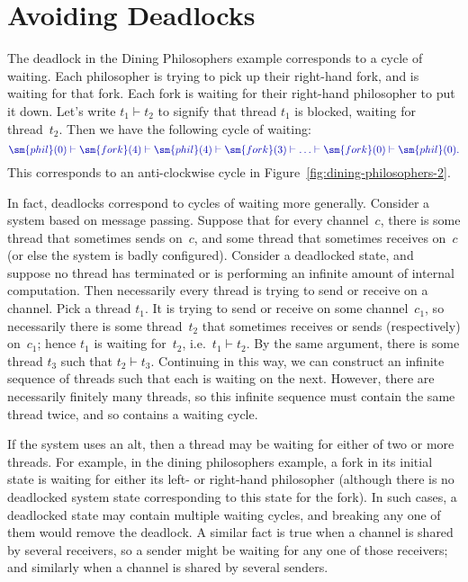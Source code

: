 \section{Avoiding Deadlocks}
\label{sec:avoid-deadlocks}

\def\waitingFor{\vdash}

The deadlock in the Dining Philosophers example corresponds to a cycle of
waiting.  Each philosopher is trying to pick up their right-hand fork, and is
waiting for that fork.  Each fork is waiting for their right-hand philosopher
to put it down.  Let's write $t_1 \waitingFor t_2$ to signify that thread
$t_1$ is blocked, waiting for thread~$t_2$.  Then we have the following cycle
of waiting:
\[\mstyle
\sm{phil}(0) \waitingFor \sm{fork}(4) \waitingFor \sm{phil}(4) \waitingFor
  \sm{fork}(3) \waitingFor \ldots \waitingFor \sm{fork}(0) \waitingFor
  \sm{phil}(0).
\]
This corresponds to an anti-clockwise cycle in
Figure~\ref{fig:dining-philosophers-2}.

In fact, deadlocks correspond to cycles of waiting more generally.  Consider a
system based on message passing.  Suppose that for every channel~$c$, there
is some thread that sometimes sends on~$c$, and some thread that sometimes
receives on~$c$ (or else the system is badly configured).  Consider a
deadlocked state, and suppose no thread has terminated or is performing an
infinite amount of internal computation.  Then necessarily every thread is
trying to send or receive on a channel.  Pick a thread $t_1$.  It is trying to
send or receive on some channel~$c_1$, so necessarily there is some
thread~$t_2$ that sometimes receives or sends (respectively) on~$c_1$; hence
$t_1$ is waiting for~$t_2$, i.e.~$t_1 \waitingFor t_2$.  By the same argument,
there is some thread $t_3$ such that $t_2 \waitingFor t_3$.  Continuing in
this way, we can construct an infinite sequence of threads such that each is
waiting on the next.  However, there are necessarily finitely many threads, so
this infinite sequence must contain the same thread twice, and so contains a
waiting cycle.

If the system uses an alt, then a thread may be waiting for either of two or
more threads.  For example, in the dining philosophers example, a fork in its
initial state is waiting for either its left- or right-hand philosopher
(although there is no deadlocked system state corresponding to this state for
the fork).  In such cases, a deadlocked state may contain multiple waiting
cycles, and breaking any one of them would remove the deadlock.  A similar
fact is true when a channel is shared by several receivers, so a sender might
be waiting for any one of those receivers; and similarly when a channel is
shared by several senders.

